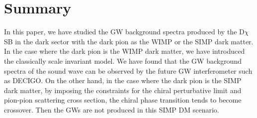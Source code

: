 \documentclass[a4paper,preprint,superscriptaddress,preprintnumbers,nofootinbib]{revtex4}
\newcommand{\al}[1]{\begin{align}#1\end{align}}
\newcommand{\df}{\text{d}}
\newcommand{\fn}[1]{\!\left(#1\right)}
\newcommand{\bra}{\langle}
\newcommand{\ket}{\rangle}
\begin{document}




\section{Summary}\label{summary}
In this paper,  we have studied the GW background {spectra} produced by the D$\chi$SB in the dark sector with the dark pion as the WIMP or the SIMP dark matter.
In the case where the dark pion is the WIMP dark matter, we have introduced the classically scale invariant model.
We have found that the GW background {spectra} of the sound wave can be observed by the future GW interferometer such as DECIGO.
On the other hand, in the case where the dark pion is the SIMP dark matter, by imposing the constraints for the chiral perturbative limit and {pion-pion scattering} cross section, the chiral phase transition tends to become crossover.
Then the GWs are not produced in this SIMP DM scenario.
\end{document}
